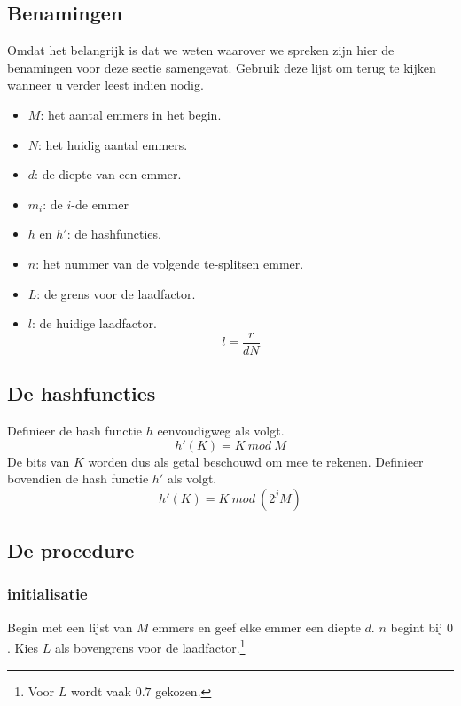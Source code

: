 \documentclass[hashing.tex]{subfiles}
\begin{document}
\subsection{Benamingen}
Omdat het belangrijk is dat we weten waarover we spreken zijn hier de benamingen voor deze sectie samengevat. Gebruik deze lijst om terug te kijken wanneer u verder leest indien nodig.
\begin{itemize}
\item $M$: het aantal emmers in het begin.
\item $N$: het huidig aantal emmers.
\item $d$: de diepte van een emmer.
\item $m_i$: de $i$-de emmer
\item $h$ en $h'$: de hashfuncties.
\item $n$: het nummer van de volgende te-splitsen emmer.
\item $L$: de grens voor de laadfactor.
\item $l$: de huidige laadfactor.
\[
l = \frac{r}{dN}
\]
\end{itemize}

\subsection{De hashfuncties}
Definieer de hash functie $h$ eenvoudigweg als volgt. 
\[
h'(K) = K\ mod\ M
\]
De bits van $K$ worden dus als getal beschouwd om mee te rekenen.
Definieer bovendien de hash functie $h'$ als volgt.
\[
h'(K) = K\ mod\ (2^{j}M)
\]

\subsection{De procedure}
\subsubsection{initialisatie}
Begin met een lijst van $M$ emmers en geef elke emmer een diepte $d$. $n$ begint bij $0$. Kies $L$ als bovengrens voor de laadfactor.\footnote{Voor $L$ wordt vaak $0.7$ gekozen.}
\end{document}
